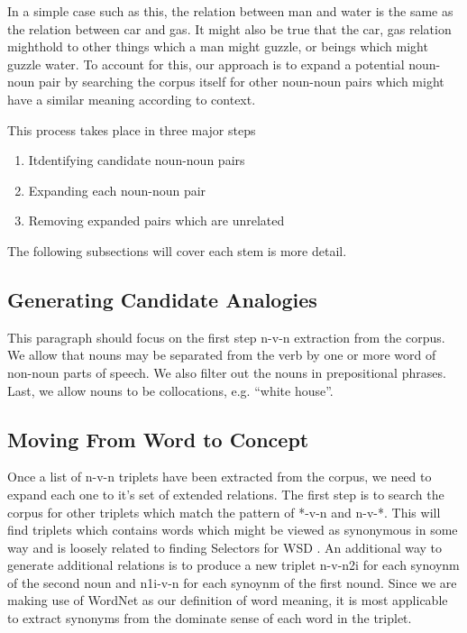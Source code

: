 \documentclass[11pt]{article}
\begin{document}
In a simple case such as this, the relation between man and water is the same as
the relation between car and gas.  It might also be true that the car, gas
relation mighthold to other things which a man might guzzle, or beings which
might guzzle water.  To account for this, our approach is to expand a potential
noun-noun pair by searching the corpus itself for other noun-noun pairs which
might have a similar meaning according to context.

This process takes place in three major steps
\begin{enumerate}
  \item Itdentifying candidate noun-noun pairs
  \item Expanding each noun-noun pair
  \item Removing expanded pairs which are unrelated
\end{enumerate}

The following subsections will cover each stem is more detail.

\subsection{Generating Candidate Analogies}

This paragraph should focus on the first step n-v-n extraction from the corpus.
We allow that nouns may be separated from the verb by one or more word of
non-noun parts of speech.  We also filter out the nouns in prepositional
phrases.  Last, we allow nouns to be collocations, e.g. ``white house''.

\subsection{Moving From Word to Concept}

Once a list of n-v-n triplets have been extracted from the corpus, we need to
expand each one to it's set of extended relations.  The first step is to search
the corpus for other triplets which match the pattern of *-v-n and n-v-*.  This
will find triplets which contains words which might be viewed as synonymous in
some way and is loosely related to finding Selectors for WSD \cite{}.  An
additional way to generate additional relations is to produce a new triplet
n-v-n2i for each synoynm of the second noun and n1i-v-n for each synoynm of the
first nound.  Since we are making use of WordNet as our definition of word
meaning, it is most applicable to extract synonyms from the dominate sense of
each word in the triplet.  
\end{document}
